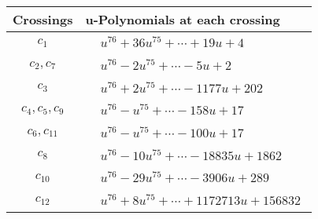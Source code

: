 \documentclass[1p]{elsarticle_modified}
\theoremstyle{definition}
\begin{document}
\begin{tabular}{m{50pt}|m{274pt}}
Crossings & \hspace{64pt}u-Polynomials at each crossing \\
\hline $$\begin{aligned}c_{1}\end{aligned}$$&$\begin{aligned}
&u^{76}+36 u^{75}+\cdots+19 u+4
\end{aligned}$\\
\hline $$\begin{aligned}c_{2},c_{7}\end{aligned}$$&$\begin{aligned}
&u^{76}-2 u^{75}+\cdots-5 u+2
\end{aligned}$\\
\hline $$\begin{aligned}c_{3}\end{aligned}$$&$\begin{aligned}
&u^{76}+2 u^{75}+\cdots-1177 u+202
\end{aligned}$\\
\hline $$\begin{aligned}c_{4},c_{5},c_{9}\end{aligned}$$&$\begin{aligned}
&u^{76}- u^{75}+\cdots-158 u+17
\end{aligned}$\\
\hline $$\begin{aligned}c_{6},c_{11}\end{aligned}$$&$\begin{aligned}
&u^{76}- u^{75}+\cdots-100 u+17
\end{aligned}$\\
\hline $$\begin{aligned}c_{8}\end{aligned}$$&$\begin{aligned}
&u^{76}-10 u^{75}+\cdots-18835 u+1862
\end{aligned}$\\
\hline $$\begin{aligned}c_{10}\end{aligned}$$&$\begin{aligned}
&u^{76}-29 u^{75}+\cdots-3906 u+289
\end{aligned}$\\
\hline $$\begin{aligned}c_{12}\end{aligned}$$&$\begin{aligned}
&u^{76}+8 u^{75}+\cdots+1172713 u+156832
\end{aligned}$\\
\hline
\end{tabular}\\~\\
\end{document}
